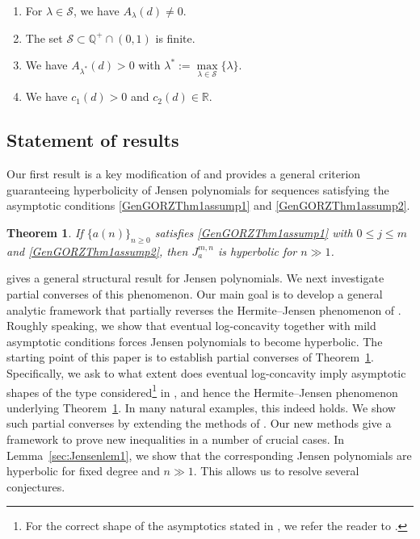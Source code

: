 \documentclass[11pt,reqno,a4paper]{amsart}
\renewcommand{\l}{\lambda}
\renewcommand{\(}{\left\(}
\renewcommand{\)}{\right\)}
\numberwithin{equation}{section}
\theoremstyle{plain}
\newtheorem{theorem}{Theorem}[section]
\theoremstyle{definition} %
\numberwithin{equation}{section}
\begin{document}
\begin{enumerate}[label=(C\arabic*), start=7,  labelwidth=\widthof{(C99)}, %
	leftmargin=\labelwidth+\labelsep, %
	align=left]
		\item \label{genexampleassump1} For $\l\in \mathcal{S}$, we have $A_{\l}(d)\neq 0$.
	\item \label{genexampleassump2} The set $\mathcal{S}\subset\mathbb{Q}^{+}\cap (0,1)$ is finite.
	\item \label{genexampleassump3} We have $A_{\l^{*}}(d)>0$ with $\l^{*}:=\underset{\l \in \mathcal{S}}{\max}\{\l \}$.
	\item \label{genexampleassump4} We have $c_1(d)>0$ and $c_2(d)\in \mathbb{R}$.
\end{enumerate} 
 
 
\subsection{Statement of results} Our first result is a key modification of \cite[Theorem 3]{GORZ} and provides a general criterion guaranteeing hyperbolicity of Jensen polynomials for sequences satisfying the asymptotic conditions \ref{GenGORZThm1assump1} and \ref{GenGORZThm1assump2}. 


\begin{theorem}\label{GenGORZcor1}
 If $\{a(n)\}_{n\ge 0}$ satisfies {\rm{\ref{GenGORZThm1assump1}}} with $0\le j\le m$ and {\rm{\ref{GenGORZThm1assump2}}}, then $J^{m,n}_{a}$ is hyperbolic for $n\gg 1$.
\end{theorem}



  gives a general structural result for Jensen polynomials. We next investigate partial converses of this phenomenon. Our main goal is to develop a general analytic framework that partially reverses the Hermite–Jensen phenomenon of \cite{GORZ}. Roughly speaking, we show that eventual log-concavity together with mild asymptotic conditions forces Jensen polynomials to become hyperbolic. The starting point of this paper is to establish partial converses of Theorem~\ref{GenGORZcor1}. Specifically, we ask to what extent does eventual log-concavity imply asymptotic shapes of the type considered\footnote{ For the correct shape of the asymptotics stated in \cite[equation (4)]{GORZ}, we refer the reader to \cite{GORZ}.} in \cite[(15)]{GORZ}, and hence the Hermite--Jensen phenomenon underlying Theorem~\ref{GenGORZcor1}. In many natural examples, this indeed holds. We show such partial converses by extending the methods of \cite{GORZ}.  Our new methods give a framework to prove new inequalities in a number of crucial cases. In Lemma~\ref{sec:Jensenlem1}, we show that the corresponding Jensen polynomials are hyperbolic for fixed degree and $n\!\gg\!1$. This allows us to resolve several conjectures. 
 
\end{document}

